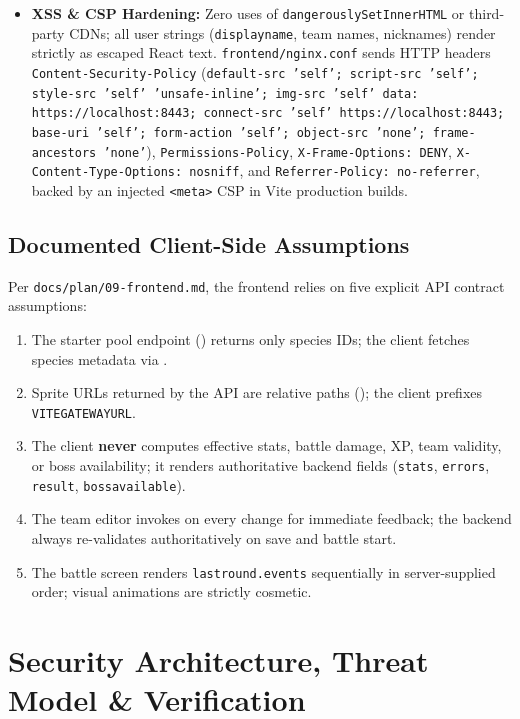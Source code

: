 \documentclass[10.5pt,a4paper]{article}
\DeclareRobustCommand{\code}[1]{\begingroup\def\_{\textunderscore\allowbreak}\texttt{#1}\endgroup}
\begin{document}
\begin{itemize}
  \item \textbf{XSS \& CSP Hardening:} Zero uses of \code{dangerouslySetInnerHTML} or third-party CDNs; all user strings (\code{display\_name}, team names, nicknames) render strictly as escaped React text. \code{frontend/nginx.conf} sends HTTP headers \code{Content-Security-Policy} (\code{default-src 'self'; script-src 'self'; style-src 'self' 'unsafe-inline'; img-src 'self' data: https://localhost:8443; connect-src 'self' https://localhost:8443; base-uri 'self'; form-action 'self'; object-src 'none'; frame-ancestors 'none'}), \code{Permissions-Policy}, \code{X-Frame-Options: DENY}, \code{X-Content-Type-Options: nosniff}, and \code{Referrer-Policy: no-referrer}, backed by an injected \code{<meta>} CSP in Vite production builds.
\end{itemize}

\subsection{Documented Client-Side Assumptions}

Per \code{docs/plan/09-frontend.md}, the frontend relies on five explicit API contract assumptions:
\begin{enumerate}
  \item The starter pool endpoint () returns only species IDs; the client fetches species metadata via .
  \item Sprite URLs returned by the API are relative paths (); the client prefixes \code{VITE\_GATEWAY\_URL}.
  \item The client \textbf{never} computes effective stats, battle damage, XP, team validity, or boss availability; it renders authoritative backend fields (\code{stats}, \code{errors}, \code{result}, \code{boss\_available}).
  \item The team editor invokes  on every change for immediate feedback; the backend always re-validates authoritatively on save and battle start.
  \item The battle screen renders \code{last\_round.events} sequentially in server-supplied order; visual animations are strictly cosmetic.
\end{enumerate}

\section{Security Architecture, Threat Model \& Verification}
\label{sec:security}
\end{document}
